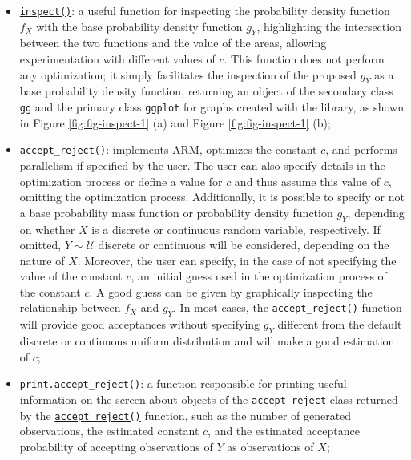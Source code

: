 \begin{itemize}
\item
  \href{https://prdm0.github.io/AcceptReject/reference/inspect.html}{\texttt{inspect()}}: a useful function for inspecting the probability density function \(f_X\) with the base probability density function \(g_Y\), highlighting the intersection between the two functions and the value of the areas, allowing experimentation with different values of \(c\). This function does not perform any optimization; it simply facilitates the inspection of the proposed \(g_Y\) as a base probability density function, returning an object of the secondary class \texttt{gg} and the primary class \texttt{ggplot} for graphs created with the  library, as shown in Figure \ref{fig:fig-inspect-1} (a) and Figure \ref{fig:fig-inspect-1} (b);
\item
  \href{https://prdm0.github.io/AcceptReject/reference/accept_reject.html}{\texttt{accept\_reject()}}: implements ARM, optimizes the constant \(c\), and performs parallelism if specified by the user. The user can also specify details in the optimization process or define a value for \(c\) and thus assume this value of \(c\), omitting the optimization process. Additionally, it is possible to specify or not a base probability mass function or probability density function \(g_Y\), depending on whether \(X\) is a discrete or continuous random variable, respectively. If omitted, \(Y \sim \mathcal{U}\) discrete or continuous will be considered, depending on the nature of \(X\). Moreover, the user can specify, in the case of not specifying the value of the constant \(c\), an initial guess used in the optimization process of the constant \(c\). A good guess can be given by graphically inspecting the relationship between \(f_X\) and \(g_Y\). In most cases, the \texttt{accept\_reject()} function will provide good acceptances without specifying \(g_Y\) different from the default discrete or continuous uniform distribution and will make a good estimation of \(c\);
\item
  \href{https://prdm0.github.io/AcceptReject/reference/print.accept_reject.html}{\texttt{print.accept\_reject()}}: a function responsible for printing useful information on the screen about objects of the \texttt{accept\_reject} class returned by the \href{https://prdm0.github.io/AcceptReject/reference/accept_reject.html}{\texttt{accept\_reject()}} function, such as the number of generated observations, the estimated constant \(c\), and the estimated acceptance probability of accepting observations of \(Y\) as observations of \(X\);

\end{itemize}
